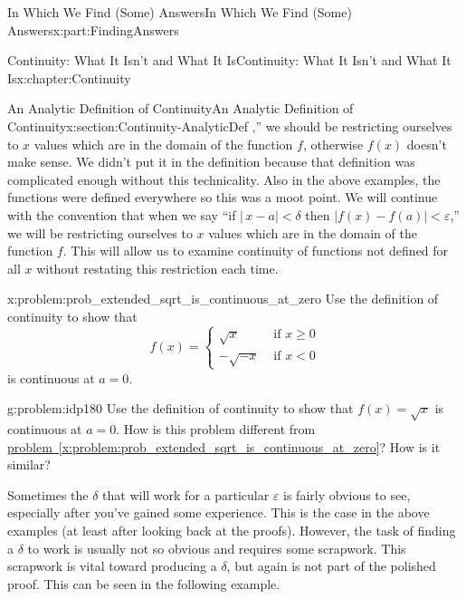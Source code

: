 \documentclass[oneside,10pt,]{book}
\newcommand{\xreffont}{\relax}
\newcommand{\terminology}[1]{\textbf{#1}}
\numberwithin{equation}{section}
\newcommand{\eps}{\varepsilon}
\newcommand{\lt}{<}
\newcommand{\amp}{&}
\begin{document}
\begin{partptx}{In Which We Find (Some) Answers}{}{In Which We Find (Some) Answers}{}{}{x:part:FindingAnswers}
\begin{chapterptx}{Continuity: What It Isn't and What It Is}{}{Continuity: What It Isn't and What It Is}{}{}{x:chapter:Continuity}
\begin{sectionptx}{An Analytic Definition of Continuity}{}{An Analytic Definition of Continuity}{}{}{x:section:Continuity-AnalyticDef}
\eps\),'' we should be restricting ourselves to \(x\) values which are in the domain of the function \(f\), otherwise \(f(x)\) doesn't make sense.  We didn't put it in the definition because that definition was complicated enough without this technicality.  Also in the above examples, the functions were defined everywhere so this was a moot point.  We will continue with the convention that when we say ``if \(|\,x-a|\lt \delta\) then \(|f(x)-f(a)|\lt \eps\),'' we will be restricting ourselves to \(x\) values which are in the domain of the function \(f\).  This will allow us to examine continuity of functions not defined for all \(x\) without restating this restriction each time.%
\begin{problem}{}{x:problem:prob_extended_sqrt_is_continuous_at_zero}%
 Use the definition of continuity to show that%
\begin{equation*}
f(x)= \begin{cases}\sqrt{x} \amp  \text{ if }  x\ge0\\ -\sqrt{-x} \amp  \text{ if }  x\lt 0 \end{cases}
\end{equation*}
is continuous at \(a=0\).%
\end{problem}
\begin{problem}{}{g:problem:idp180}%
 Use the definition of continuity to show that \(f(x)=
\sqrt{x}\) is continuous at \(a=0\).  How is this problem different from \hyperref[x:problem:prob_extended_sqrt_is_continuous_at_zero]{problem~{\xreffont\ref{x:problem:prob_extended_sqrt_is_continuous_at_zero}}}? How is it similar?%
\end{problem}
Sometimes the \(\delta\) that will work for a particular \(\eps\) is fairly obvious to see, especially after you've gained some experience.  This is the case in the above examples (at least after looking back at the proofs).  However, the task of finding a \(\delta\) to work is usually not so obvious and requires some scrapwork.  This scrapwork is vital toward producing a \(\delta\), but again is not part of the polished proof.  This can be seen in the following example.%
\end{sectionptx}
\end{chapterptx}
\end{partptx}
\end{document}
